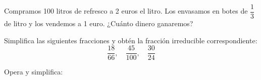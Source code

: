 \documentclass[spanish, 11pt]{exam}
\begin{document}
\begin{questions}


\question[2] Compramos 100 litros de refresco a 2 euros el litro. Los envasamos en botes de \( \dfrac{1}{3} \) de litro y los vendemos a 1 euro. ¿Cuánto dinero ganaremos?

\question[1] Simplifica las siguientes fracciones y obtén la fracción irreducible correspondiente:  
\[
\dfrac{18}{66}, \quad \dfrac{45}{100}, \quad  \dfrac{30}{24}
\]


\question Opera y simplifica:  
\end{questions}
\end{document}
